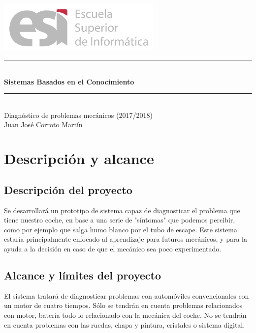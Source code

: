 \documentclass[a4paper,12pt]{article}
\begin{document}
\begin{titlepage}
\begin{center}

\includegraphics[width=0.6\textwidth]{logoesi}\\[5cm]

\rule{\linewidth}{0.5mm} \\[0.4cm]
{ \huge \bfseries Sistemas Basados en el Conocimiento\\[0.4cm] }
\rule{\linewidth}{0.5mm} \\[1.5cm]
{\huge Diagnóstico de problemas mecánicos (2017/2018)}\\[0.5cm]

\large{Juan Jos\'e Corroto Mart\'in}

\end{center}
\end{titlepage}

\tableofcontents
\newpage

\section{Descripción y alcance}
\subsection{Descripción del proyecto}
Se desarrollará un prototipo de sistema capaz de diagnosticar el problema que tiene nuestro coche, en base a una serie de "síntomas" que podemos percibir, como por ejemplo que salga humo blanco por el tubo de escape. Este sistema estaría principalmente enfocado al aprendizaje para futuros mecánicos, y para la ayuda a la decisión en caso de que el mecánico sea poco experimentado.

\subsection{Alcance y límites del proyecto}
El sistema tratará de diagnosticar problemas con automóviles convencionales con un motor de cuatro tiempos. Sólo se tendrán en cuenta problemas relacionados con motor, batería todo lo relacionado con la mecánica del coche. No se tendrán en cuenta problemas con las ruedas, chapa y pintura, cristales o sistema digital.
\end{document}
